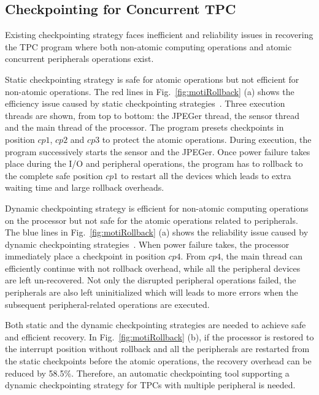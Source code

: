 \subsection{Checkpointing for Concurrent TPC} \label{sec:motiSW}
%
Existing checkpointing strategy faces inefficient and reliability issues in recovering the TPC program where both non-atomic computing operations and atomic concurrent peripherals operations exist.

Static checkpointing strategy is safe for atomic operations but not efficient for non-atomic operations.
The red lines in Fig.~\ref{fig:motiRollback} (a) shows the efficiency issue caused by static checkpointing strategies~\cite{ransford2012mementos,Lucia2015,jayakumar2014quickrecall}.
Three execution threads are shown, from top to bottom: the JPEGer thread, the sensor thread and the main thread of the processor.
The program presets checkpoints in position $cp1$, $cp2$ and $cp3$ to protect the atomic operations.
During execution, the program successively starts the sensor and the JPEGer.
Once power failure takes place during the I/O and peripheral operations, the program has to rollback to the complete safe position $cp1$ to restart all the devices which leads to extra waiting time and large rollback overheads.

Dynamic checkpointing strategy is efficient for non-atomic computing operations on the processor but not safe for the atomic operations related to peripherals.
The blue lines in Fig.~\ref{fig:motiRollback} (a) shows the reliability issue caused by dynamic checkpointing strategies~\cite{wang20123us,liu2016a,Liu2015Ambient,balsamo2015hibernus}.
When power failure takes, the processor immediately place a checkpoint in position $cp4$.
From $cp4$, the main thread can efficiently continue with not rollback overhead, while all the peripheral devices are left un-recovered. 
Not only the disrupted peripheral operations failed, the peripherals are also left uninitialized which will leads to more errors when the subsequent peripheral-related operations are executed.

%
Both static and the dynamic checkpointing strategies are needed to achieve safe and efficient recovery.
In Fig.~\ref{fig:motiRollback} (b), if the processor is restored to the interrupt position without rollback and all the peripherals are restarted from the static checkpoints before the atomic operations, the recovery overhead can be reduced by 58.5\%.
Therefore, an automatic checkpointing tool supporting a dynamic checkpointing strategy for TPCs with multiple peripheral is needed. 


